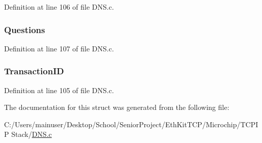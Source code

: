 Definition at line 106 of file D\+N\+S.\+c.

\hypertarget{struct_d_n_s___h_e_a_d_e_r_afecf1635048108f6024d67f09c6cb96d}{}
\subsubsection[{Questions}]{ Questions}\label{struct_d_n_s___h_e_a_d_e_r_afecf1635048108f6024d67f09c6cb96d}


Definition at line 107 of file D\+N\+S.\+c.

\hypertarget{struct_d_n_s___h_e_a_d_e_r_a5a0dfb5b1d8d29e0a0be61eeaae10de1}{}
\subsubsection[{Transaction\+I\+D}]{ Transaction\+I\+D}\label{struct_d_n_s___h_e_a_d_e_r_a5a0dfb5b1d8d29e0a0be61eeaae10de1}


Definition at line 105 of file D\+N\+S.\+c.



The documentation for this struct was generated from the following file\+:\begin{DoxyCompactItemize}
\item 
C\+:/\+Users/mainuser/\+Desktop/\+School/\+Senior\+Project/\+Eth\+Kit\+T\+C\+P/\+Microchip/\+T\+C\+P\+I\+P Stack/\hyperlink{_d_n_s_8c}{D\+N\+S.\+c}\end{DoxyCompactItemize}
